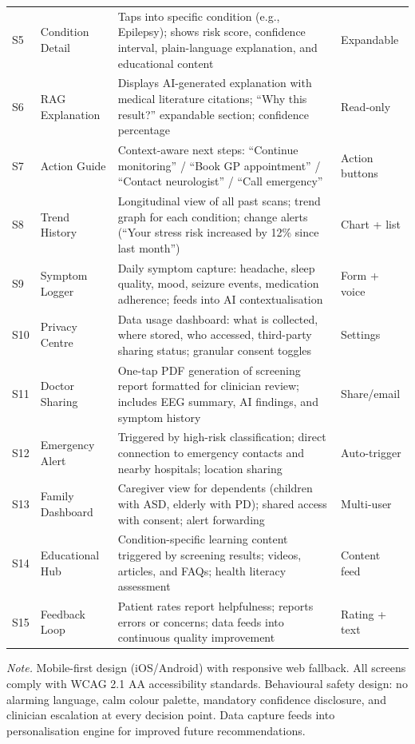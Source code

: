 {\begin{xltabular}{\textwidth}{@{} >{\raggedright\arraybackslash}p{0.6cm} >{\raggedright\arraybackslash}p{2.8cm} L >{\raggedright\arraybackslash}p{2.5cm} @{}}
\addlinespace
S5 & Condition Detail & Taps into specific condition (e.g., Epilepsy); shows risk score, confidence interval, plain-language explanation, and educational content & Expandable \\
\addlinespace
S6 & RAG Explanation & Displays AI-generated explanation with medical literature citations; ``Why this result?'' expandable section; confidence percentage & Read-only \\
\addlinespace
S7 & Action Guide & Context-aware next steps: ``Continue monitoring'' / ``Book GP appointment'' / ``Contact neurologist'' / ``Call emergency'' & Action buttons \\
\addlinespace
S8 & Trend History & Longitudinal view of all past scans; trend graph for each condition; change alerts (``Your stress risk increased by 12\% since last month'') & Chart + list \\
\addlinespace
S9 & Symptom Logger & Daily symptom capture: headache, sleep quality, mood, seizure events, medication adherence; feeds into AI contextualisation & Form + voice \\
\addlinespace
S10 & Privacy Centre & Data usage dashboard: what is collected, where stored, who accessed, third-party sharing status; granular consent toggles & Settings \\
\addlinespace
S11 & Doctor Sharing & One-tap PDF generation of screening report formatted for clinician review; includes EEG summary, AI findings, and symptom history & Share/email \\
\addlinespace
S12 & Emergency Alert & Triggered by high-risk classification; direct connection to emergency contacts and nearby hospitals; location sharing & Auto-trigger \\
\addlinespace
S13 & Family Dashboard & Caregiver view for dependents (children with ASD, elderly with PD); shared access with consent; alert forwarding & Multi-user \\
\addlinespace
S14 & Educational Hub & Condition-specific learning content triggered by screening results; videos, articles, and FAQs; health literacy assessment & Content feed \\
\addlinespace
S15 & Feedback Loop & Patient rates report helpfulness; reports errors or concerns; data feeds into continuous quality improvement & Rating + text \\
\end{xltabular}}
\vspace{0.5em}
\noindent\textit{Note.} Mobile-first design (iOS/Android) with responsive web fallback. All screens comply with WCAG 2.1 AA accessibility standards. Behavioural safety design: no alarming language, calm colour palette, mandatory confidence disclosure, and clinician escalation at every decision point. Data capture feeds into personalisation engine for improved future recommendations.
\fi %

